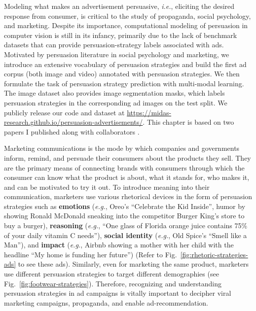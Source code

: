\documentclass[hidelinks,11pt,a4paper]{report}
\renewcommand{\cite}[1]{\citep{#1}}
\begin{document}
 Modeling what makes an advertisement persuasive, \textit{i.e.}, eliciting the desired response from consumer, is critical to the study of propaganda, social psychology, and marketing. Despite its importance, computational modeling of persuasion in computer vision is still in its infancy, primarily due to the lack of benchmark datasets that can provide persuasion-strategy labels associated with ads. Motivated by persuasion literature in social psychology and marketing, we introduce an extensive vocabulary of persuasion strategies and build the first ad corpus (both image and video) annotated with persuasion strategies. We then formulate the task of persuasion strategy prediction with multi-modal learning. The image dataset also provides image segmentation masks, which labels persuasion strategies in the corresponding ad images on the test split. We publicly release our code and dataset at \url{https://midas-research.github.io/persuasion-advertisements/}. This chapter is based on two papers I published along with collaborators \cite{kumar2023persuasion,bhattacharyya-etal-2023-video}.




Marketing communications is the mode by which companies and governments inform, remind, and persuade their consumers about the products they sell. They are the primary means of connecting brands with consumers through which the consumer can know what the product is about, what it stands for, who makes it, and can be motivated to try it out. To introduce meaning into their communication, marketers use various rhetorical devices in the form of persuasion strategies such as \textbf{emotions} ({\it e.g.}, Oreo's ``Celebrate the Kid Inside'', humor by showing Ronald McDonald sneaking into the competitor Burger King's store to buy a burger), \textbf{reasoning} ({\it e.g.}, ``One glass of Florida orange juice contains 75\% of your daily vitamin C needs''), \textbf{social identity} ({\it e.g.}, Old Spice's ``Smell like a Man''), and \textbf{impact} ({\it e.g.}, Airbnb showing a mother with her child with the headline ``My home is funding her future'') (Refer to Fig.~\ref{fig:rhetoric-strategies-ads} to see these ads). Similarly, even for marketing the same product, marketers use different persuasion strategies to target different demographies (see Fig.~\ref{fig:footwear-strategies}). Therefore, recognizing and understanding persuasion strategies in ad campaigns is vitally important to decipher viral marketing campaigns, propaganda, and enable ad-recommendation. 
\end{document}

